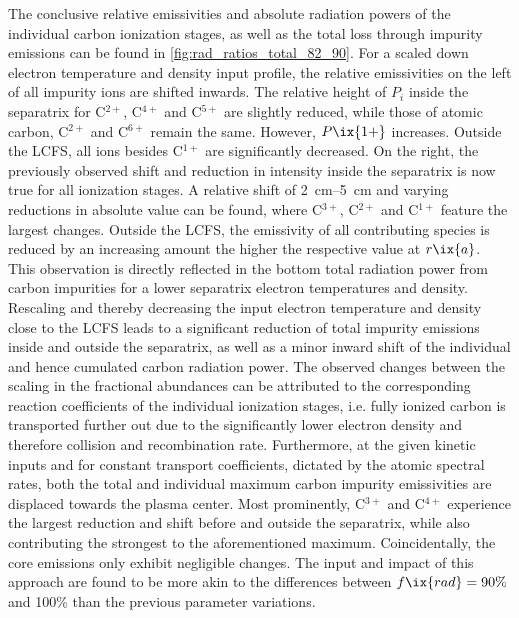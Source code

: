 %
                The conclusive relative emissivities and absolute radiation powers of the individual carbon ionization stages, as well as the total loss through impurity emissions can be found in \cref{fig:rad_ratios_total_82_90}. For a scaled down electron temperature and density input profile, the relative emissivities on the left of all impurity ions are shifted inwards. The relative height of $P_{i}$ inside the separatrix for C$^{2+}$, C$^{4+}$ and C$^{5+}$ are slightly reduced, while those of atomic carbon, C$^{2+}$ and C$^{6+}$ remain the same. However, $P\ix{1+}$ increases. Outside the LCFS, all ions besides C$^{1+}$ are significantly decreased. On the right, the previously observed shift and reduction in intensity inside the separatrix is now true for all ionization stages. A relative shift of \SIrange{2}{5}{\centi\meter} and varying reductions in absolute value can be found, where C$^{3+}$, C$^{2+}$ and C$^{1+}$ feature the largest changes. Outside the LCFS, the emissivity of all contributing species is reduced by an increasing amount the higher the respective value at $r\ix{a}$. This observation is directly reflected in the bottom total radiation power from carbon impurities for a lower separatrix electron temperatures and density.\\%
                Rescaling and thereby decreasing the input electron temperature and density close to the LCFS leads to a significant reduction of total impurity emissions inside and outside the separatrix, as well as a minor inward shift of the individual and hence cumulated carbon radiation power. The observed changes between the scaling in the fractional abundances can be attributed to the corresponding reaction coefficients of the individual ionization stages, i.e. fully ionized carbon is transported further out due to the significantly lower electron density and therefore collision and recombination rate. Furthermore, at the given kinetic inputs and for constant transport coefficients, dictated by the atomic spectral rates, both the total and individual maximum carbon impurity emissivities are displaced towards the plasma center. Most prominently, C$^{3+}$ and C$^{4+}$ experience the largest reduction and shift before and outside the separatrix, while also contributing the strongest to the aforementioned maximum. Coincidentally, the core emissions only exhibit negligible changes. The input and impact of this approach are found to be more akin to the differences between $f\ix{rad}=90\%$ and 100\% than the previous parameter variations.\\%
